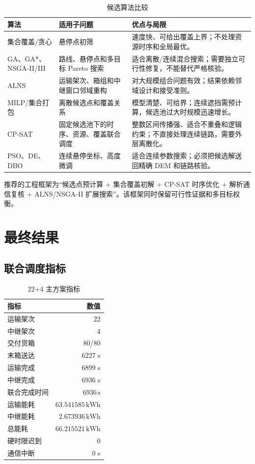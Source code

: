 \documentclass[UTF8,a4paper,12pt]{ctexart}
\begin{document}
\begin{table}[H]\centering\caption{候选算法比较}
\begin{tabular}{p{2.5cm}p{4.2cm}p{5.3cm}}
\toprule
算法&适用子问题&优点与局限\\\midrule
集合覆盖/贪心&悬停点初筛&速度快、可给出覆盖上界；不处理资源时序和全局最优。\\
GA、GA*、NSGA-II/III&路线、悬停点和多目标 Pareto 搜索&适合离散/连续混合搜索；需要独立可行性修复，不能替代严格核验。\\
ALNS&运输架次、箱组和中继窗口邻域重构&对大规模组合问题有效；结果依赖邻域设计和接受准则。\\
MILP/集合打包&离散候选点和覆盖关系&模型清楚、可给界；连续遮挡需预计算，候选池过大时规模迅速增长。\\
CP-SAT&固定候选池下的时序、资源、覆盖联合调度&整数区间传播强、适合不重叠和逻辑约束；不直接处理连续链路，需要外层离散化。\\
PSO、DE、DBO&连续悬停坐标、高度微调&适合连续参数搜索；必须把候选解送回精确 DEM 和链路核验。\\
\bottomrule
\end{tabular}\end{table}

推荐的工程框架为“候选点预计算 + 集合覆盖初解 + CP-SAT 时序优化 + 解析通信复核 + ALNS/NSGA-II 扩展搜索”。该框架同时保留可行性证据和多目标权衡。

\section{最终结果}

\subsection{联合调度指标}
\begin{table}[H]\centering\caption{22+4 主方案指标}
\begin{tabular}{lr}
\toprule
指标&数值\\\midrule
运输架次&22\\
中继架次&4\\
交付货箱&80/80\\
末箱送达&6227 s\\
运输完成&6899 s\\
中继完成&6936 s\\
联合完成时间&$6936\,\mathrm{s}$\\
运输能耗&$63.541585\,\mathrm{kWh}$\\
中继能耗&$2.673936\,\mathrm{kWh}$\\
总能耗&$66.215521\,\mathrm{kWh}$\\
硬时限迟到&0\\
通信中断&0 s\\
\bottomrule
\end{tabular}\end{table}
\end{document}
